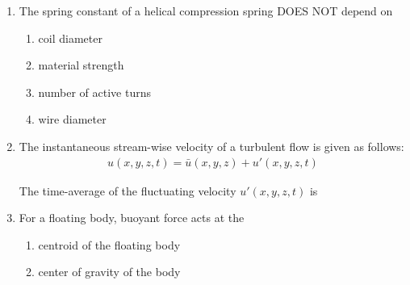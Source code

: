 \documentclass[journal,11pt,onecolumn]{IEEEtran}
\begin{document}
\begin{enumerate}
    \item The spring constant of a helical compression spring DOES NOT depend on

          \begin{enumerate}

              \item coil diameter

              \item material strength

              \item number of active turns

              \item wire diameter

          \end{enumerate}

    \item The instantaneous stream-wise velocity of a turbulent flow is given as follows:
          \begin{align}
              u(x,y,z,t) = \bar{u}(x,y,z) + u'(x,y,z,t)
          \end{align}

          The time-average of the fluctuating velocity $u'(x,y,z,t)$ is

          \begin{enumerate}


          \end{enumerate}

    \item For a floating body, buoyant force acts at the

          \begin{enumerate}

              \item centroid of the floating body

              \item center of gravity of the body


\end{enumerate}
\end{enumerate}
\end{document}
